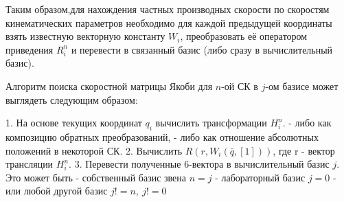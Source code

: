 Таким образом,для нахождения частных производных скорости по скоростям кинематических параметров необходимо для каждой предыдущей координаты взять известную векторную константу $W_i$, преобразовать её оператором приведения $R^n_i$ и перевести в связанный базис (либо сразу в вычислительный базис). 

Алгоритм поиска скоростной матрицы Якоби для $n$-ой СК в $j$-ом базисе может выглядеть следующим образом:

1. На основе текущих координат $q_i$ вычислить трансформации $H^n_i$.
	- либо как композицию обратных преобразований,
	- либо как отношение абсолютных положений в некоторой СК. 
2. Вычислить $R(r, W_i(\bar{q},[1]))$, где r - вектор трансляции $H^n_i$.
3. Перевести полученные 6-вектора в вычислительный базис $j$. Это может быть 
	- собственный базис звена $n = j$
	- лабораторный базис $j = 0$
	- или любой другой базис $j != n,\ j != 0$